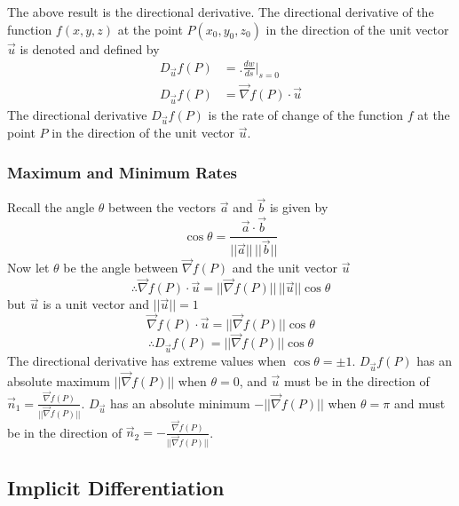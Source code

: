 \documentclass[14pt]{article}
\begin{document}
    The above result is the directional derivative. The directional
    derivative of the function $f(x,y,z)$ at the point $P(x_0,y_0,z_0)$
    in the direction of the unit vector $\vec u$ is denoted and defined
    by
    \begin{align*}
        D_{\vec u}f(P)&=\bigg. \frac{dw}{ds}\bigg|_{s=0}\\
        D_{\vec u}f(P)&=\vec\nabla f(P)\cdot \vec u
    \end{align*}
    The directional derivative $D_{\vec u}f(P)$ is the rate of change of
    the function $f$ at the point $P$ in the direction of the unit
    vector $\vec u$.
    \subsubsection{Maximum and Minimum Rates}
    Recall the angle $\theta$ between the vectors $\vec a$ and $\vec b$
    is given by
    $$\cos\theta=\frac{\vec a\cdot \vec b}{||\vec a||\, ||\vec b||}$$
    Now let $\theta$ be the angle between $\vec\nabla f(P)$ and the unit
    vector $\vec u$
    $$\therefore \vec\nabla f(P)\cdot \vec u=||\vec\nabla f(P)||\,||\vec
    u||\cos\theta$$ but $\vec u$ is a unit vector and $||\vec u||=1$
    $$\vec\nabla f(P)\cdot \vec u=||\vec\nabla f(P)||\cos\theta$$
    $$\therefore D_{\vec u}f(P)= ||\vec\nabla f(P)||\cos\theta$$ The
    directional derivative has extreme values when $\cos\theta=\pm1$.
    $D_{\vec u}f(P)$ has an absolute maximum $||\vec\nabla f(P)||$ when
    $\theta=0$, and $\vec u$ must be in the direction of $\vec
    n_1=\frac{\vec\nabla f(P)}{||\vec\nabla f(P)||}$. $D_{\vec u}$ has
    an absolute minimum $-||\vec\nabla f(P)||$ when $\theta=\pi$ and
    must be in the direction of $\vec n_2=-\frac{\vec\nabla
    f(P)}{||\vec\nabla f(P)||}$.
    \subsection{Implicit Differentiation}
\end{document}
